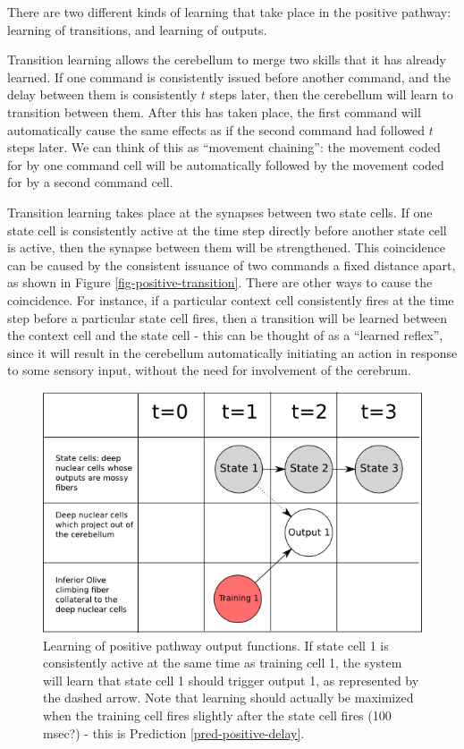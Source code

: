 \documentclass{article}
\theoremstyle{definition}
\begin{document}
There are two different kinds of learning that take place in the
positive pathway: learning of transitions, and learning of outputs.

Transition learning allows the cerebellum to merge two skills that it
has already learned. If one command is consistently issued before
another command, and the delay between them is consistently $t$ steps
later, then the cerebellum will learn to transition between
them. After this has taken place, the first command will automatically
cause the same effects as if the second command had followed $t$ steps
later. We can think of this as ``movement chaining'': the movement
coded for by one command cell will be automatically followed by the
movement coded for by a second command cell.

Transition learning takes place at the synapses between two state
cells. If one state cell is consistently active at the time step
directly before another state cell is active, then the synapse between
them will be strengthened. This coincidence can be caused by the
consistent issuance of two commands a fixed distance apart, as shown
in Figure \ref{fig-positive-transition}. There are other ways to cause
the coincidence. For instance, if a particular context cell
consistently fires at the time step before a particular state cell
fires, then a transition will be learned between the context cell and
the state cell - this can be thought of as a ``learned reflex'',
since it will result in the cerebellum automatically initiating an
action in response to some sensory input, without the need for
involvement of the cerebrum.

\begin{figure}
\includegraphics[width=0.95\linewidth]{positive_output.png}
\caption{Learning of positive pathway output functions. If state cell
  1 is consistently active at the same time as training cell 1, the
  system will learn that state cell 1 should trigger output 1, as
  represented by the dashed arrow. Note that learning should actually
  be maximized when the training cell fires slightly after the state
  cell fires (100 msec?) - this is Prediction
  \ref{pred-positive-delay}.}
\label{fig-positive-output}
\end{figure}
\end{document}
